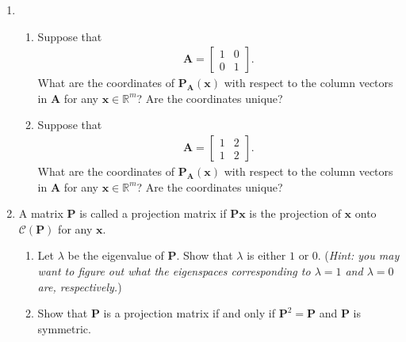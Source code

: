 \documentclass[11pt,letter,notitlepage]{article}
\begin{document}
\begin{exercise}
\begin{enumerate}
        \item  
            \begin{enumerate}
                \item Suppose that 
                    \begin{align*}
                        \mathbf{A} = \left[
                        \begin{matrix}
                            1 & 0\\
                            0 & 1
                        \end{matrix}
                        \right] .
                    \end{align*}
                     What are the coordinates of $\mathbf{P}_{\mathbf{A}}(\mathbf{x})$ with respect to the column vectors in $\mathbf{A}$ for any $\mathbf{x} \in \mathbb{R}^m$? Are the coordinates unique?
                \item Suppose that
                    \begin{align*}
                        \mathbf{A} = \left[
                            \begin{matrix}
                                1 & 2\\
                                1 & 2
                            \end{matrix}
                        \right] .
                    \end{align*}
                    What are the coordinates of $\mathbf{P}_{\mathbf{A}}(\mathbf{x})$ with respect to the column vectors in $\mathbf{A}$ for any $\mathbf{x} \in \mathbb{R}^m$? Are the coordinates unique?
            \end{enumerate}
        
	   \item A matrix $\mathbf{P}$ is called a projection matrix if $\mathbf{P}\mathbf{x}$ is the projection of $\mathbf{x}$ onto $\mathcal{C}(\mathbf{P})$ for any $\mathbf{x}$.
	        \begin{enumerate}
	            \item Let $\lambda$ be the eigenvalue of $\mathbf{P}$. Show that $\lambda$ is either $1$ or $0$. (\emph{Hint: you may want to figure out what the eigenspaces corresponding to $\lambda=1$ and $\lambda=0$ are, respectively.})
	            \item Show that $\mathbf{P}$ is a projection matrix if and only if $\mathbf{P}^2 = \mathbf{P}$ and $\mathbf{P}$ is symmetric.
	        \end{enumerate}
	   

	\end{enumerate}
\end{exercise}
\end{document}
